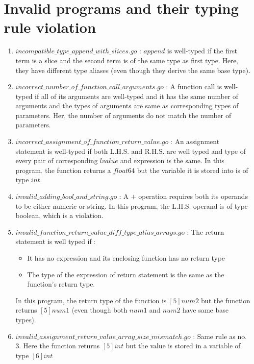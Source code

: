 \documentclass[preprint,12pt]{elsarticle}
\begin{document}
\section{Invalid programs and their typing rule violation}
\begin{enumerate}
\item $incompatible\_type\_append\_with\_slices.go$ : $append$ is well-typed if the first term is a slice and the second term is of the same type as first type. Here, they have different type aliases (even though they derive the same base type).

\item $incorrect\_number\_of\_function\_call\_arguments.go$ : A function call is well-typed if all of its arguments are well-typed and it has the same number of arguments and the types of arguments are same as corresponding types of parameters. Her, the number of arguments do not match the number of parameters.

\item $incorrect\_assignment\_of\_function\_return\_value.go$ : An assignment statement is well-typed if both L.H.S. and R.H.S. are well typed and type of every pair of corresponding $lvalue$ and expression is the same. In this program, the function returns a $float64$ but the variable it is stored into is of type $int$.

\item $invalid\_adding\_bool\_and\_string.go$ : A $+$ operation requires both its operands to be either numeric or string. In this program, the L.H.S. operand is of type boolean, which is a violation.
\item $invalid\_function\_return\_value\_diff\_type\_alias\_arrays.go$ : The return statement is well typed if : 
\begin{itemize}
\item It has no expression and its enclosing function has no return type
\item The type of the expression of return statement is the same as the function's return type.
\end{itemize}
In this program, the return type of the function is $[5]num2$ but the function returns $[5]num1$ (even though both $num1$ and $num2$ have same base types).

\item $invalid\_assignment\_return\_value\_array\_size\_mismatch.go$ : Same rule as no. $3$. Here the function returns $[5]int$ but the value is stored in a variable of type $[6]int$


\end{enumerate}
\end{document}
